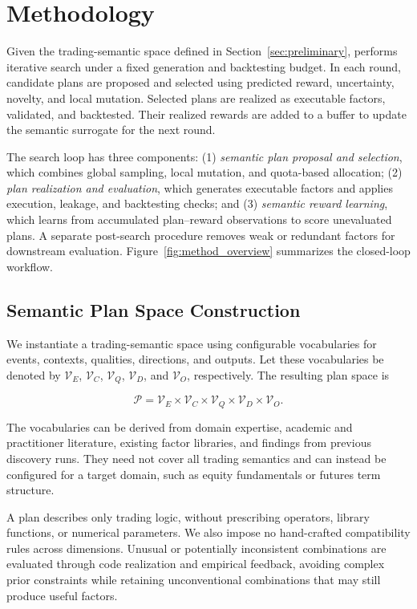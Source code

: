 \section{Methodology}
\label{sec:methodology}

Given the trading-semantic space defined in
Section~\ref{sec:preliminary}, \method{} performs iterative search under
a fixed generation and backtesting budget. In each round, candidate
plans are proposed and selected using predicted reward, uncertainty,
novelty, and local mutation. Selected plans are realized as executable
factors, validated, and backtested. Their realized rewards are added to a buffer
to update the semantic surrogate for the next round. 

The search loop has three components:
(1) \emph{semantic plan proposal and selection}, which combines global
sampling, local mutation, and quota-based allocation;
(2) \emph{plan realization and evaluation}, which generates executable
factors and applies execution, leakage, and backtesting checks; and
(3) \emph{semantic reward learning}, which learns from accumulated
plan--reward observations to score unevaluated plans.
A separate post-search procedure removes weak or redundant factors for
downstream evaluation. Figure~\ref{fig:method_overview} summarizes the
closed-loop workflow.


\subsection{Semantic Plan Space Construction}

We instantiate a trading-semantic space using configurable vocabularies
for events, contexts, qualities, directions, and outputs. Let these
vocabularies be denoted by
\(\mathcal{V}_{E}\), \(\mathcal{V}_{C}\), \(\mathcal{V}_{Q}\),
\(\mathcal{V}_{D}\), and \(\mathcal{V}_{O}\), respectively. The resulting
plan space is

\[
\mathcal{P}
=
\mathcal{V}_{E}
\times
\mathcal{V}_{C}
\times
\mathcal{V}_{Q}
\times
\mathcal{V}_{D}
\times
\mathcal{V}_{O}.
\]

The vocabularies can be derived from domain expertise, academic and
practitioner literature, existing factor libraries, and findings from
previous discovery runs. They need not cover all trading semantics and
can instead be configured for a target domain, such as equity
fundamentals or futures term structure.

A plan describes only trading logic, without prescribing operators,
library functions, or numerical parameters. We also impose no
hand-crafted compatibility rules across dimensions. Unusual or
potentially inconsistent combinations are evaluated through code
realization and empirical feedback, avoiding complex prior constraints
while retaining unconventional combinations that may still produce
useful factors.


